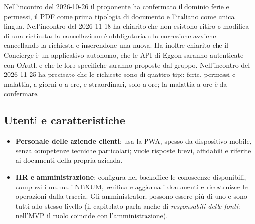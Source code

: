 \documentclass[documento]{gpt}
\begin{document}
Nell'incontro del 2026-10-26 il proponente ha confermato il dominio ferie e
permessi, il PDF come prima tipologia di documento e l'italiano come unica
lingua. Nell'incontro del 2026-11-18 ha chiarito che non esistono ritiro o
modifica di una richiesta: la cancellazione è obbligatoria e la correzione
avviene cancellando la richiesta e inserendone una nuova. Ha inoltre chiarito
che il Concierge è un applicativo autonomo, che le API di Eggon saranno
autenticate con OAuth e che le loro specifiche saranno proposte dal gruppo.
Nell'incontro del 2026-11-25 ha precisato che le richieste sono di quattro
tipi: ferie, permessi e malattia, a giorni o a ore, e straordinari, solo a
ore; la malattia a ore è da confermare.

\subsection{Utenti e caratteristiche}
\begin{itemize}
  \item \textbf{Personale delle aziende clienti}: usa la PWA, spesso da
        dispositivo mobile, senza competenze tecniche particolari; vuole
        risposte brevi, affidabili e riferite ai documenti della propria
        azienda.
  \item \textbf{HR e amministrazione}: configura nel backoffice le conoscenze
        disponibili, compresi i manuali NEXUM, verifica e aggiorna i documenti e
        ricostruisce le operazioni dalla traccia. Gli amministratori possono
        essere più di uno e sono tutti allo stesso livello (il capitolato parla
        anche di \textit{responsabili delle fonti}: nell'MVP il ruolo coincide
        con l'amministrazione).
\end{itemize}
\end{document}
